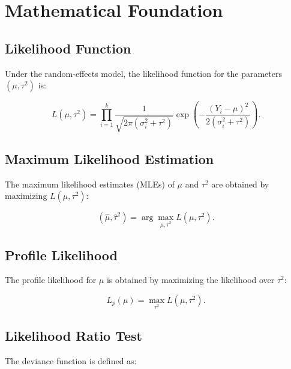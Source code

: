 \documentclass[12pt,a4paper]{report}
\begin{document}
\section{Mathematical Foundation}
\label{sec:jcr_math_foundation}

\subsection{Likelihood Function}
\label{subsec:likelihood_function}

Under the random-effects model, the likelihood function for the parameters $(\mu, \tau^2)$ is:

\begin{equation}
\label{eq:likelihood_function}
L(\mu, \tau^2) = \prod_{i=1}^k \frac{1}{\sqrt{2\pi (\sigma_i^2 + \tau^2)}} \exp\left( -\frac{(Y_i - \mu)^2}{2 (\sigma_i^2 + \tau^2)} \right).
\end{equation}

\subsection{Maximum Likelihood Estimation}
\label{subsec:mle}

The maximum likelihood estimates (MLEs) of $\mu$ and $\tau^2$ are obtained by maximizing $L(\mu, \tau^2)$:

\begin{equation}
\label{eq:mle}
(\hat{\mu}, \hat{\tau}^2) = \arg \max_{\mu, \tau^2} L(\mu, \tau^2).
\end{equation}

\subsection{Profile Likelihood}
\label{subsec:profile_likelihood}

The profile likelihood for $\mu$ is obtained by maximizing the likelihood over $\tau^2$:

\begin{equation}
\label{eq:profile_likelihood}
L_p(\mu) = \max_{\tau^2} L(\mu, \tau^2).
\end{equation}

\subsection{Likelihood Ratio Test}
\label{subsec:likelihood_ratio_test}

The deviance function is defined as:
\end{document}
